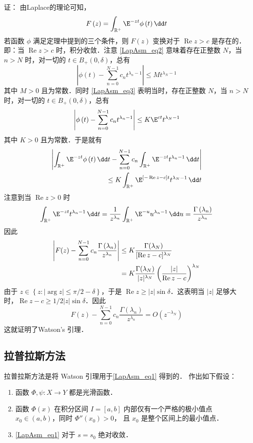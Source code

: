证：
由Laplace的理论可知， 
$$
F\left(z\right)=\int_{\mathbb{R}^+}{\E^{-zt}\phi\left(t\right)}\,\dd t
$$
若函数 $\phi$ 满足定理中提到的三个条件，则 $F(z)$ 变换对于 $\operatorname{Re} z>c$ 是存在的．即：当 $\operatorname{Re} z>c$ 时，积分收敛．注意 \autoref{LapAsm_eq2} 意味着存在正整数 $N$，当 $n>N$ 时，对一切的 $t\in B_{+}(0,\delta)$，总有
$$
  \left|\phi\left(t\right)-\sum_{n=0}^{N-1}{c_nt^{\lambda_n-1}}\right|\le Mt^{\lambda_N-1}
$$
其中 $M>0$ 且为常数．同时 \autoref{LapAsm_eq3} 表明当时，存在正整数 $N$，当 $n>N$ 时，对一切的 $t\in B_{+}(0,\delta)$，总有
\[
\left|\phi\left(t\right)-\sum_{n=0}^{N-1}{c_nt^{\lambda_n-1}}\right|\le K\E^{ct}t^{\lambda_N-1}
\]
其中 $K>0$ 且为常数．于是就有
\begin{align*}
\left|\int_{\mathbb{R}^+}{\E^{-zt}\phi\left(t\right)}\,\dd t-\sum_{n=0}^{N-1}{c_n\int_{\mathbb{R}^+}{\E^{-zt}t^{\lambda_n-1}}\,\dd t}\right|\\
\le K\int_{\mathbb{R}^+}\E^{[-\operatorname{Re}z-c]t}t^{\lambda_N-1}\,\dd t
\end{align*}
注意到当 $\operatorname{Re}z>0$ 时
\[
\int_{\mathbb{R}^+}{\E^{-zt}t^{\lambda_n-1}}\,\dd t
=\frac{1}{z^{\lambda_n}}\int_{\mathbb{R}^+}{\E^{-u}u^{\lambda_n-1}}\,\dd u
=\frac{\Gamma\left(\lambda_n\right)}{z^{\lambda_n}}
\]
因此
\begin{align*}
  \left|F(z)-\sum_{n=0}^{N-1}{c_n\frac{\Gamma\left(\lambda_n\right)}{z^{\lambda_n}}}\right|
  &\le K {\Gamma(\lambda_{N})\over \operatorname{[Re}z-c]^{\lambda_N}}\nonumber\\
  &=K{\Gamma(\lambda_{N})\over |z|^{\lambda_N}}\left(|z|\over \operatorname{Re}z-c\right)^{\lambda_N}\nonumber
\end{align*}
由于 $z\in{\left\{z:\left|\arg{z}\right|\le\pi/2-\delta\right\}}$，于是 $\operatorname{Re}z\geq |z|\sin \delta$．这表明当 $\left|z\right|$ 足够大时，$\operatorname{Re}z-c\geqslant1/2|z|\sin \delta$．因此
\[
F\left(z\right)-\sum_{n=0}^{N-1}{c_n\frac{\Gamma\left(\lambda_n\right)}{z^{\lambda_n}}}=O\left(z^{-\lambda_N}\right)
\]
这就证明了Watson's 引理．


\subsection{拉普拉斯方法}
拉普拉斯方法是将 Watson 引理用于\autoref{LapAsm_eq1} 得到的． 作出如下假设：

\begin{enumerate}
\item 函数 $\Phi,\psi:X\to Y$ 都是光滑函数．

\item 函数 $\Phi(x)$ 在积分区间 $I=[a,b]$ 内部仅有一个严格的极小值点 $x_0\in(a,b)$，同时 $\Phi''(x_0)>0$， 且 $x_0$ 是整个区间上的最小值点．

\item \autoref{LapAsm_eq1} 对于 $s=s_0$ 绝对收敛．
\end{enumerate}

